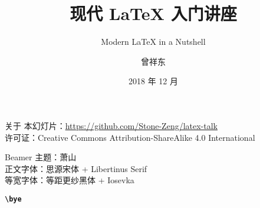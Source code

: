 \documentclass[fontset=none]{ctexbeamer}
\title{现代 \LaTeX{} 入门讲座}
\subtitle{Modern \LaTeX{} in a Nutshell}
\author{曾祥东}
\institute{复旦大学\quad 物理系}
\date{2018 年 12 月}
\newcommand\link[1]{\href{#1}{\faLink}}
\begin{document}
\maketitle

%
%
%
%
%

%

\begin{frame}{关于}
\vspace*{1.2cm}
\footnotesize
本幻灯片：\url{https://github.com/Stone-Zeng/latex-talk} \\
许可证：Creative Commons Attribution-ShareAlike 4.0 International
\vspace{0.4cm}
\begin{center}
  \huge\ccbysa
\end{center}
\vspace{2cm}
\begin{flushleft}
  \tiny
  Beamer 主题：萧山 \link{https://ctan.org/pkg/pgfornament-han} \\
  正文字体：思源宋体 + Libertinus Serif \\
  等宽字体：等距更纱黑体 + Iosevka
\end{flushleft}
\vspace{-0.5cm}
\end{frame}

\begin{frame}[standout]
  \huge \textbf{\texttt{\textbackslash bye}}
\end{frame}
\end{document}
